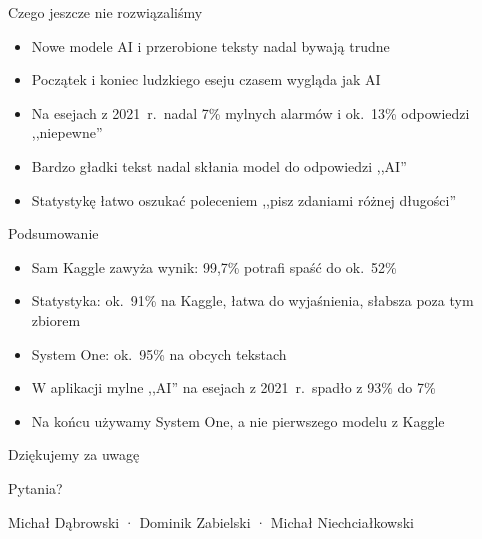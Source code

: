 \documentclass[aspectratio=169,11pt]{beamer}
\begin{document}
\begin{frame}{Czego jeszcze nie rozwiązaliśmy}
  \begin{itemize}
    \item Nowe modele AI i przerobione teksty nadal bywają trudne
    \item Początek i koniec ludzkiego eseju czasem wygląda jak AI
    \item Na esejach z 2021~r.\ nadal 7\% mylnych alarmów
          i ok.\ 13\% odpowiedzi ,,niepewne''
    \item Bardzo gładki tekst nadal skłania model do odpowiedzi ,,AI''
    \item Statystykę łatwo oszukać poleceniem
          ,,pisz zdaniami różnej długości''
  \end{itemize}
\end{frame}

\begin{frame}{Podsumowanie}
  \begin{itemize}
    \item Sam Kaggle zawyża wynik: 99,7\% potrafi spaść do ok.\ 52\%
    \item Statystyka: ok.\ 91\% na Kaggle, łatwa do wyjaśnienia,
          słabsza poza tym zbiorem
    \item System One: ok.\ 95\% na obcych tekstach
    \item W aplikacji mylne ,,AI'' na esejach z 2021~r.\ spadło z 93\% do 7\%
    \item Na końcu używamy System One, a nie pierwszego modelu z Kaggle
  \end{itemize}
\end{frame}

\begin{frame}
  \centering
  \vspace{1.5cm}
  {\LARGE Dziękujemy za uwagę}

  \vspace{1cm}
  {\Large Pytania?}

  \vspace{1.2cm}
  Michał Dąbrowski · Dominik Zabielski · Michał Niechciałkowski
\end{frame}
\end{document}
